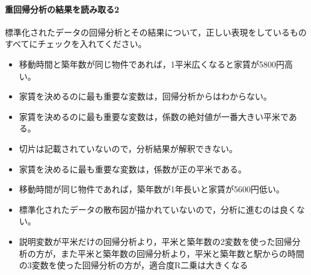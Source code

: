 \documentclass{ltjbook}
\begin{document}
\paragraph{重回帰分析の結果を読み取る2}標準化されたデータの回帰分析とその結果について，正しい表現をしているものすべてにチェックを入れてください。
\begin{itemize}
	\item 移動時間と築年数が同じ物件であれば，1平米広くなると家賃が5800円高い。
	\item 家賃を決めるのに最も重要な変数は，回帰分析からはわからない。
	\item 家賃を決めるのに最も重要な変数は，係数の絶対値が一番大きい平米である。
	\item 切片は記載されていないので，分析結果が解釈できない。
	\item 家賃を決めるに最も重要な変数は，係数が正の平米である。
	\item 移動時間が同じ物件であれば，築年数が1年長いと家賃が5600円低い。
	\item 標準化されたデータの散布図が描かれていないので，分析に進むのは良くない。
	\item 説明変数が平米だけの回帰分析より，平米と築年数の2変数を使った回帰分析の方が，また平米と築年数の回帰分析より，平米と築年数と駅からの時間の3変数を使った回帰分析の方が，適合度R二乗は大きくなる
\end{itemize}
\end{document}
